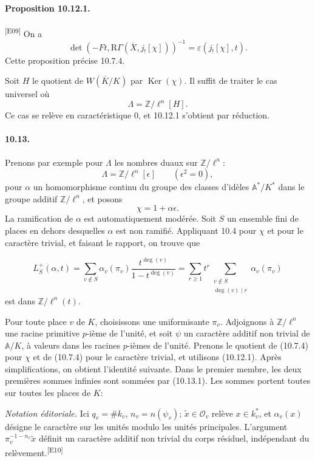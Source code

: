 \documentclass[10pt,letterpaper]{article}
\providecommand{\Ker}{\operatorname{Ker}}
\providecommand{\bbA}{\mathbb A}
\providecommand{\bbA}{\mathbb A}
\providecommand{\bbA}{\mathbb A}
\providecommand{\bbA}{\mathbb A}
\providecommand{\RGamma}{\mathrm R\Gamma}
\providecommand{\bbA}{\mathbb A}
\providecommand{\Ker}{\operatorname{Ker}}
\newcommand{\auditmark}[1]{\textsuperscript{\normalfont\scriptsize[E#1]}}
\begin{document}
\paragraph{Proposition 10.12.1.}\auditmark{09} On a
\[
\det(-Ft,\RGamma(\overline X,j_![\chi]))^{-1}=\varepsilon(j_![\chi],t).
\]
Cette proposition précise 10.7.4.

Soit \(H\) le quotient de \(W(\overline K/K)\) par \(\Ker(\chi)\). Il suffit de traiter le cas universel où
\[
\Lambda=\mathbb Z/\ell^n[H].
\]
Ce cas se relève en caractéristique \(0\), et 10.12.1 s'obtient par réduction.

\paragraph{10.13.} Prenons par exemple pour \(\Lambda\) les nombres duaux sur \(\mathbb Z/\ell^n\):
\[
\Lambda=\mathbb Z/\ell^n[\epsilon]\qquad(\epsilon^2=0),
\]
pour \(\alpha\) un homomorphisme continu du groupe des classes d'idèles \(\bbA^*/K^*\) dans le groupe additif \(\mathbb Z/\ell^n\), et posons
\[
\chi=1+\alpha\epsilon.
\]
La ramification de \(\alpha\) est automatiquement modérée. Soit \(S\) un ensemble fini de places en dehors desquelles \(\alpha\) est non ramifié. Appliquant 10.4 pour \(\chi\) et pour le caractère trivial, et faisant le rapport, on trouve que

\[
\tag{10.13.1}
L_S^+(\alpha,t)=
\sum_{v\notin S}\alpha_v(\pi_v)\frac{t^{\deg(v)}}{1-t^{\deg(v)}}
=
\sum_{r\ge1}t^r\sum_{\substack{v\notin S\\\deg(v)\mid r}}\alpha_v(\pi_v)
\]
est dans \(\mathbb Z/\ell^n(t)\).

Pour toute place \(v\) de \(K\), choisissons une uniformisante \(\pi_v\). Adjoignons à \(\mathbb Z/\ell^n\) une racine primitive \(p\)-ième de l'unité, et soit \(\psi\) un caractère additif non trivial de \(\bbA/K\), à valeurs dans les racines \(p\)-ièmes de l'unité. Prenons le quotient de (10.7.4) pour \(\chi\) et de (10.7.4) pour le caractère trivial, et utilisons (10.12.1). Après simplifications, on obtient l'identité suivante. Dans le premier membre, les deux premières sommes infinies sont sommées par (10.13.1). Les sommes portent toutes sur toutes les places de \(K\):
\par\smallskip\noindent\textit{Notation éditoriale.} Ici \(q_v=\#k_v\), \(n_v=n(\psi_v)\);
\(\widetilde x\in\mathcal O_v\) relève \(x\in k_v^*\), et
\(\alpha_v(x)\) désigne le caractère sur les unités modulo les unités principales.
L'argument \(\pi_v^{-1-n_v}\widetilde x\) définit un caractère additif non trivial
du corps résiduel, indépendant du relèvement.\auditmark{10}
\end{document}
